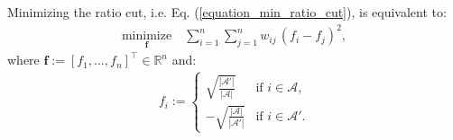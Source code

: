 \documentclass[lang=cn,10pt]{gorgeousnbook}
\numberwithin{equation}{section}%
\numberwithin{figure}{section}%
\begin{document}
\begin{proposition}
Minimizing the ratio cut, i.e. Eq. (\ref{equation_min_ratio_cut}), is equivalent to:
\begin{align}\label{equation_minimization_spectral_clustering_w_f}
\underset{\boldsymbol{f}}{\text{minimize}} \quad \sum_{i=1}^n \sum_{j=1}^n w_{ij}\, (f_i - f_j)^2, 
\end{align}
where $\boldsymbol{f} := [f_1, \dots, f_n]^\top \in \mathbb{R}^n$ and:
\begin{align}\label{equation_f_definition}
f_i := 
\left\{
    \begin{array}{ll}
        \sqrt{\frac{|\mathcal{A}'|}{|\mathcal{A}|}} & \mbox{if } i \in \mathcal{A}, \\
        -\sqrt{\frac{|\mathcal{A}|}{|\mathcal{A}'|}} & \mbox{if } i \in \mathcal{A}'.
    \end{array}
\right.
\end{align}
\end{proposition}
\end{document}
